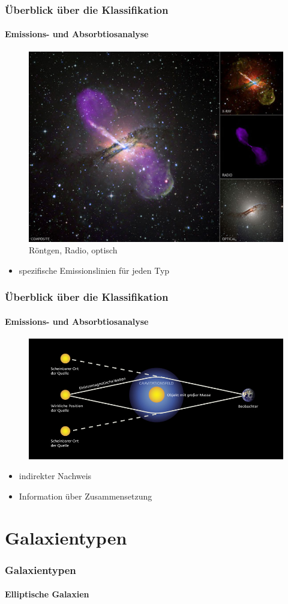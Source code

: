 \begin{frame}
\frametitle{Überblick über die Klassifikation}
\framesubtitle{Emissions- und Absorbtiosanalyse}


\begin{figure}
\includegraphics[scale=0.35]{Radiogalaxie.jpg}
\caption{Röntgen, Radio, optisch}
\end{figure}

\begin{itemize}
\item spezifische Emissionslinien für jeden Typ
\end{itemize}

\end{frame}


\begin{frame}
\frametitle{Überblick über die Klassifikation}
\framesubtitle{Emissions- und Absorbtiosanalyse}

\begin{figure}
\includegraphics[scale=0.7]{Gravitationslinse.jpg}
\end{figure}

\begin{itemize}
\item indirekter Nachweis
\item Information über Zusammensetzung
\end{itemize}

\end{frame}


\section{Galaxientypen}

\begin{frame}
\frametitle{Galaxientypen}
\framesubtitle{Elliptische Galaxien}


\end{frame}





